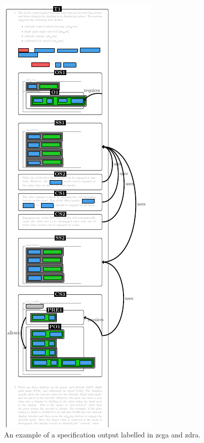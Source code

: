 \begin{figure}[H]
\begin{minipage}{0.45\textwidth}
%
 \includegraphics[scale=0.75]{Figures/fullexample/sfzdracorrectout.png}
 \caption{An example of a specification output labelled in \gls{zcga} and \gls{zdra}.\label{fig:sfzdrazcgaout}}
 \end{minipage}
 \end{figure}

